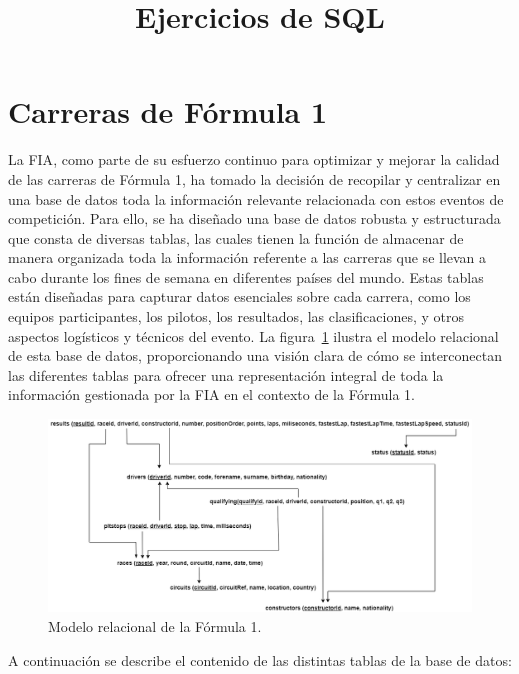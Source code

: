 \documentclass{db-practice}
\title{Ejercicios de SQL}
\begin{document}
\maketitle

\section{Carreras de Fórmula 1}

La \ac{FIA}, como parte de su esfuerzo continuo para optimizar y mejorar la calidad de las carreras de Fórmula 1, ha tomado la decisión de recopilar y centralizar en una base de datos toda la información relevante relacionada con estos eventos de competición. Para ello, se ha diseñado una base de datos robusta y estructurada que consta de diversas tablas, las cuales tienen la función de almacenar de manera organizada toda la información referente a las carreras que se llevan a cabo durante los fines de semana en diferentes países del mundo. Estas tablas están diseñadas para capturar datos esenciales sobre cada carrera, como los equipos participantes, los pilotos, los resultados, las clasificaciones, y otros aspectos logísticos y técnicos del evento. La figura~\ref{fig:relacional} ilustra el modelo relacional de esta base de datos, proporcionando una visión clara de cómo se interconectan las diferentes tablas para ofrecer una representación integral de toda la información gestionada por la \ac{FIA} en el contexto de la Fórmula 1.

\begin{figure}[H]
  \centering
  \includegraphics[width=\textwidth]{figs/modelo-relacional}
  \caption{Modelo relacional de la Fórmula 1.}
  \label{fig:relacional}
\end{figure}

A continuación se describe el contenido de las distintas tablas de la base de datos:
\end{document}
